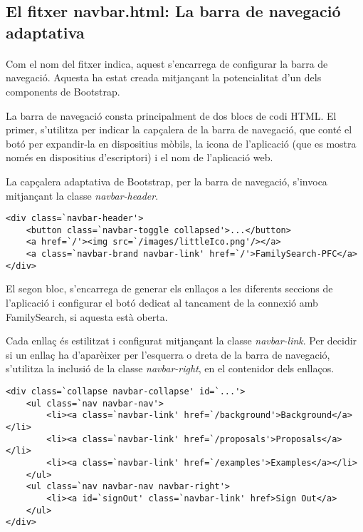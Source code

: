\subsection{El fitxer navbar.html: La barra de navegació adaptativa}

    \paragraph{}
    Com el nom del fitxer indica, aquest s'encarrega de configurar la barra de navegació. Aquesta ha estat creada mitjançant la potencialitat d'un dels components de Bootstrap.

    La barra de navegació consta principalment de dos blocs de codi HTML. El primer, s'utilitza per indicar la capçalera de la barra de navegació, que conté el botó per expandir-la en dispositius mòbils, la icona de l'aplicació (que es mostra només en dispositius d'escriptori) i el nom de l'aplicació web.

    La capçalera adaptativa de Bootstrap, per la barra de navegació, s'invoca mitjançant la classe \emph{navbar-header}.

    \begin{lstlisting}[style=rawOwn,caption={Capçalera de la barra de navegació}]
<div class=`navbar-header'>
    <button class=`navbar-toggle collapsed'>...</button>
    <a href=`/'><img src=`/images/littleIco.png'/></a>
    <a class=`navbar-brand navbar-link' href=`/'>FamilySearch-PFC</a>
</div>
    \end{lstlisting}

    El segon bloc, s'encarrega de generar els enllaços a les diferents seccions de l'aplicació i configurar el botó dedicat al tancament de la connexió amb FamilySearch, si aquesta està oberta.

    Cada enllaç és estilitzat i configurat mitjançant la classe \emph{navbar-link}. Per decidir si un enllaç ha d'aparèixer per l'esquerra o dreta de la barra de navegació, s'utilitza la inclusió de la classe \emph{navbar-right}, en el contenidor dels enllaços.

    \begin{lstlisting}[style=rawOwn,caption={Enllaços de la barra de navegació}]
<div class=`collapse navbar-collapse' id=`...'>
	<ul class=`nav navbar-nav'>
		<li><a class=`navbar-link' href=`/background'>Background</a></li>
		<li><a class=`navbar-link' href=`/proposals'>Proposals</a></li>
		<li><a class=`navbar-link' href=`/examples'>Examples</a></li>
	</ul>
	<ul class=`nav navbar-nav navbar-right'>
		<li><a id=`signOut' class=`navbar-link' href>Sign Out</a>
	</ul>
</div>
    \end{lstlisting}
